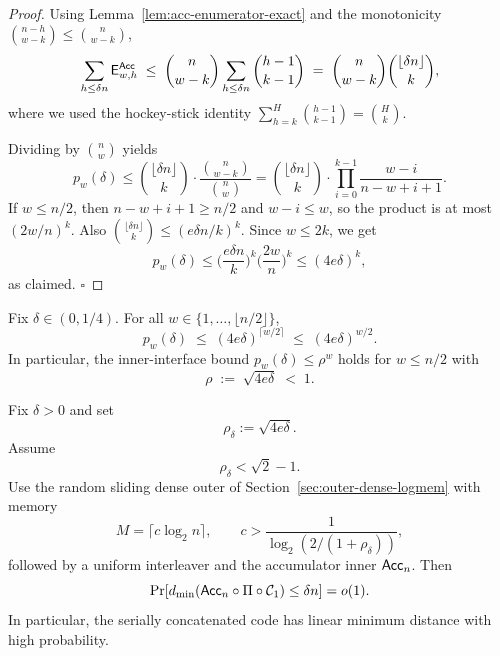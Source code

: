 \begin{proof}
Using Lemma~\ref{lem:acc-enumerator-exact} and the monotonicity \(\binom{n-h}{w-k}\le \binom{n}{w-k}\),
\[
\sum_{h\le \delta n}\mathsf{E}^{\mathsf{Acc}}_{w,h}
\;\le\;
\binom{n}{w-k}\sum_{h\le \delta n}\binom{h-1}{k-1}
\;=\;
\binom{n}{w-k}\binom{\lfloor \delta n\rfloor}{k},
\]
where we used the hockey-stick identity \(\sum_{h=k}^{H}\binom{h-1}{k-1}=\binom{H}{k}\).

Dividing by \(\binom{n}{w}\) yields
\[
p_w(\delta)\le \binom{\lfloor \delta n\rfloor}{k}\cdot \frac{\binom{n}{w-k}}{\binom{n}{w}}
=
\binom{\lfloor \delta n\rfloor}{k}\cdot \prod_{i=0}^{k-1}\frac{w-i}{n-w+i+1}.
\]
If \(w\le n/2\), then \(n-w+i+1\ge n/2\) and \(w-i\le w\), so the product is at most \((2w/n)^k\).
Also \(\binom{\lfloor \delta n\rfloor}{k}\le (e\delta n/k)^k\).
Since \(w\le 2k\), we get
\[
p_w(\delta)\le \Big(\frac{e\delta n}{k}\Big)^k \Big(\frac{2w}{n}\Big)^k
\le (4e\delta)^k,
\]
as claimed. \(\square\)
\end{proof}

\begin{corollary}
\label{cor:acc-inner-interface}
Fix \(\delta\in(0,1/4)\). For all \(w\in\{1,\dots,\lfloor n/2\rfloor\}\),
\[
p_w(\delta)\;\le\; (4e\delta)^{\lceil w/2\rceil}
\;\le\;
(4e\delta)^{w/2}.
\]
In particular, the inner-interface bound \(p_w(\delta)\le \rho^w\) holds for \(w\le n/2\) with
\[
\rho \;:=\; \sqrt{4e\delta}\;<\;1.
\]
\end{corollary}

\begin{theorem}
\label{thm:accumulator-warmup-linear-distance}
Fix \(\delta>0\) and set
\[
\rho_\delta:=\sqrt{4e\delta}.
\]
Assume
\[
\rho_\delta<\sqrt2-1.
\]
Use the random sliding dense outer of Section~\ref{sec:outer-dense-logmem} with memory
\[
M=\lceil c\log_2 n\rceil,
\qquad
c>\frac{1}{\log_2(2/(1+\rho_\delta))},
\]
followed by a uniform interleaver and the accumulator inner \(\mathsf{Acc}_n\).  Then
\[
\Pr[d_{\min}(\mathsf{Acc}_n\circ\Pi\circ{\mathcal{C}_1})\le \delta n]=o(1).
\]
In particular, the serially concatenated code has linear minimum distance with high probability.
\end{theorem}

